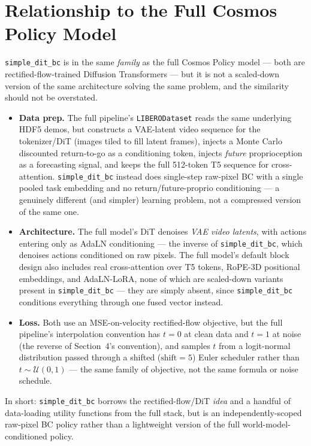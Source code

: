\documentclass[11pt]{article}
\begin{document}
\section{Relationship to the Full Cosmos Policy Model}
\label{sec:relationship}

\texttt{simple\_dit\_bc} is in the same \emph{family} as the full Cosmos Policy model --- both are
rectified-flow-trained Diffusion Transformers --- but it is not a scaled-down version of the same
architecture solving the same problem, and the similarity should not be overstated.

\begin{itemize}[nosep]
    \item \textbf{Data prep.} The full pipeline's \texttt{LIBERODataset} reads the same underlying
    HDF5 demos, but constructs a VAE-latent video sequence for the tokenizer/DiT (images tiled to
    fill latent frames), injects a Monte Carlo discounted return-to-go as a conditioning token,
    injects \emph{future} proprioception as a forecasting signal, and keeps the full 512-token T5
    sequence for cross-attention. \texttt{simple\_dit\_bc} instead does single-step raw-pixel BC
    with a single pooled task embedding and no return/future-proprio conditioning --- a
    genuinely different (and simpler) learning problem, not a compressed version of the same one.
    \item \textbf{Architecture.} The full model's DiT denoises \emph{VAE video latents}, with
    actions entering only as AdaLN conditioning --- the inverse of \texttt{simple\_dit\_bc}, which
    denoises actions conditioned on raw pixels. The full model's default block design also
    includes real cross-attention over T5 tokens, RoPE-3D positional embeddings, and AdaLN-LoRA,
    none of which are scaled-down variants present in \texttt{simple\_dit\_bc} --- they are simply
    absent, since \texttt{simple\_dit\_bc} conditions everything through one fused vector instead.
    \item \textbf{Loss.} Both use an MSE-on-velocity rectified-flow objective, but the full
    pipeline's interpolation convention has $t=0$ at clean data and $t=1$ at noise (the reverse of
    Section~4's convention), and samples $t$ from a logit-normal distribution passed through a
    shifted ($\text{shift}=5$) Euler scheduler rather than $t \sim \mathcal{U}(0,1)$ --- the same
    family of objective, not the same formula or noise schedule.
\end{itemize}

In short: \texttt{simple\_dit\_bc} borrows the rectified-flow/DiT \emph{idea} and a handful of
data-loading utility functions from the full stack, but is an independently-scoped raw-pixel BC
policy rather than a lightweight version of the full world-model-conditioned policy.
\end{document}
